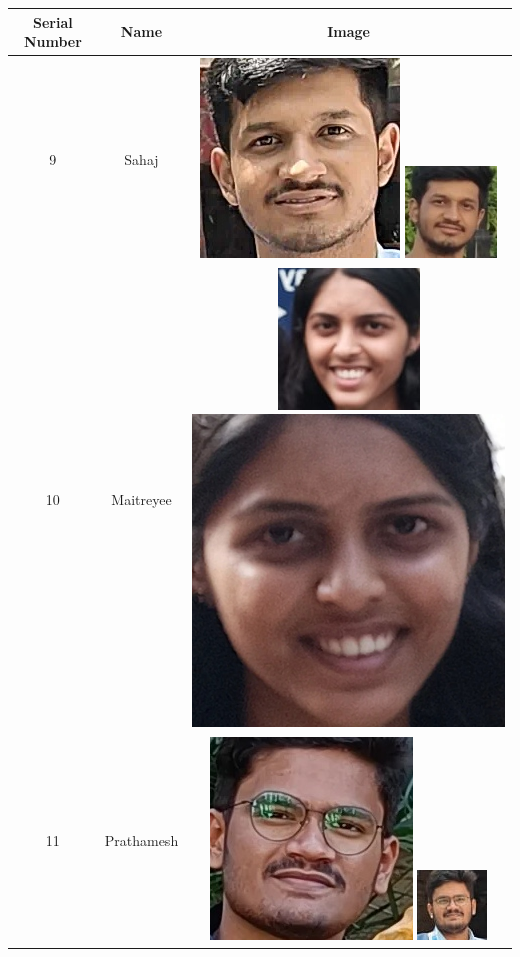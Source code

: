 \documentclass[openany]{report}
\begin{document}
\begin{table}[H]
    \centering
    \begin{tabular}{|c|c|c|}
        \hline
        \textbf{Serial Number} & \textbf{Name} & \textbf{Image}                                        \\
        \hline
        9                      & Sahaj         & \includegraphics[height=.15\textwidth]{../imgs/sahaj (17).jpg}
        \includegraphics[height=.15\textwidth]{../imgs/sahaj (42).jpg}
        \\
        \hline
        10                      & Maitreyee         & \includegraphics[height=.15\textwidth]{../imgs/maitreyee (21).jpg}
        \includegraphics[height=.15\textwidth]{../imgs/maitreyee (78).jpg}
        \\
        \hline
        \hline
        11                      & Prathamesh         & \includegraphics[height=.15\textwidth]{../imgs/prathamesh (27).jpg}
        \includegraphics[height=.15\textwidth]{../imgs/prathamesh.jpg}
        \\
        \hline

\end{tabular}
\end{table}
\end{document}
